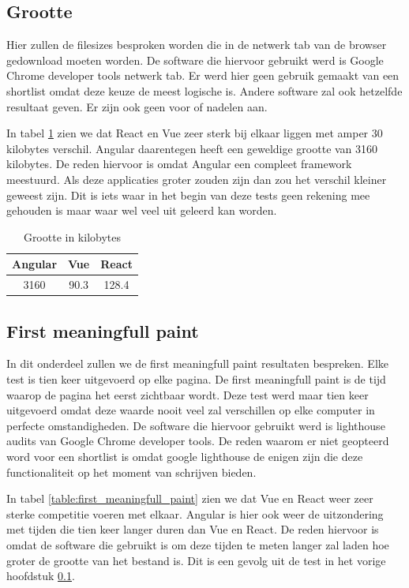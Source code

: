 \subsection{Grootte}
\label{sec:grootte}

Hier zullen de filesizes besproken worden die in de netwerk tab van de browser gedownload moeten worden. De software die hiervoor gebruikt werd is Google Chrome developer tools netwerk tab. Er werd hier geen gebruik gemaakt van een shortlist omdat deze keuze de meest logische is. Andere software zal ook hetzelfde resultaat geven. Er zijn ook geen voor of nadelen aan.

In tabel \ref{table:file_sizes} zien we dat React en Vue zeer sterk bij elkaar liggen met amper 30 kilobytes verschil. Angular daarentegen heeft een geweldige grootte van 3160 kilobytes. De reden hiervoor is omdat Angular een compleet framework meestuurd. Als deze applicaties groter zouden zijn dan zou het verschil kleiner geweest zijn. Dit is iets waar in het begin van deze tests geen rekening mee gehouden is maar waar wel veel uit geleerd kan worden.

\begin{table}[h]
	\centering
	\caption{Grootte in kilobytes}
	\label{table:file_sizes}
	\begin{tabular}{|c|c|c|} \hline
		Angular &Vue   &React \\ \hline
		3160     &90.3  &128.4 \\ \hline
	\end{tabular}
\end{table}

\subsection{First meaningfull paint}
\label{sec:first_meaningfull_paint}

In dit onderdeel zullen we de first meaningfull paint resultaten bespreken. Elke test is tien keer uitgevoerd op elke pagina. De first meaningfull paint is de tijd waarop de pagina het eerst zichtbaar wordt. Deze test werd maar tien keer uitgevoerd omdat deze waarde nooit veel zal verschillen op elke computer in perfecte omstandigheden. De software die hiervoor gebruikt werd is lighthouse audits van Google Chrome developer tools. De reden waarom er niet geopteerd word voor een shortlist is omdat google lighthouse de enigen zijn die deze functionaliteit op het moment van schrijven bieden.

In tabel \ref{table:first_meaningfull_paint} zien we dat Vue en React weer zeer sterke competitie voeren met elkaar. Angular is hier ook weer de uitzondering met tijden die tien keer langer duren dan Vue en React. De reden hiervoor is omdat de software die gebruikt is om deze tijden te meten langer zal laden hoe groter de grootte van het bestand is. Dit is een gevolg uit de test in het vorige hoofdstuk \ref{sec:grootte}.

